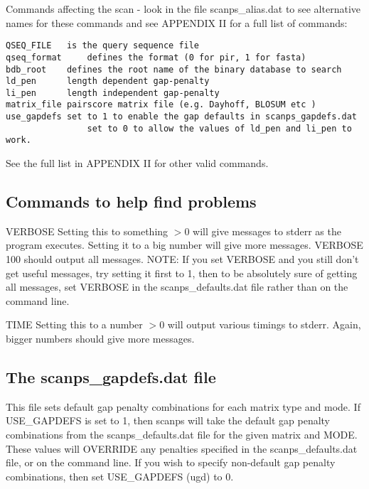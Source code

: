 \documentclass[12pt]{article}
\begin{document}
Commands affecting the scan - look in the file scanps\_alias.dat to see
alternative names for these commands and see APPENDIX II for a full list 
of commands:

\begin{scriptsize}
\begin{verbatim}
QSEQ_FILE  	is the query sequence file
qseq_format 	defines the format (0 for pir, 1 for fasta)
bdb_root	defines the root name of the binary database to search
ld_pen		length dependent gap-penalty
li_pen		length independent gap-penalty
matrix_file	pairscore matrix file (e.g. Dayhoff, BLOSUM etc )
use_gapdefs	set to 1 to enable the gap defaults in scanps_gapdefs.dat
                set to 0 to allow the values of ld_pen and li_pen to work.
\end{verbatim}
\end{scriptsize}

See the full list in APPENDIX II for other valid commands.


\subsection{Commands to help find problems}


VERBOSE Setting this to something $> 0$ will give messages to stderr as
the program executes.  Setting it to a big number will give more
messages.  VERBOSE 100 should output all messages.  NOTE: If you set
VERBOSE and you still don't get useful messages, try setting it first
to 1, then to be absolutely sure of getting all messages, set VERBOSE
in the scanps\_defaults.dat file rather than on the command line.

TIME Setting this to a number $> 0$ will output various timings to
stderr.  Again, bigger numbers should give more messages.


\subsection{The scanps\_gapdefs.dat file}

This file sets default gap penalty combinations for each matrix type
and mode.  If USE\_GAPDEFS is set to 1, then scanps will take the
default gap penalty combinations from the scanps\_defaults.dat file for
the given matrix and MODE.  These values will OVERRIDE any penalties
specified in the scanps\_defaults.dat file, or on the command
line.  If you wish to specify non-default gap penalty combinations,
then set USE\_GAPDEFS (ugd) to 0.
\end{document}
